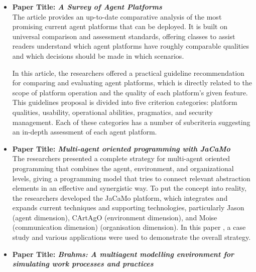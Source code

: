 \begin{itemize}[label={}]
\vspace{.5cm}

\item \textbf{Paper Title: \textit{A Survey of Agent Platforms}}\\

The article \cite{survey} provides an up-to-date comparative analysis of the most promising current agent platforms that can be deployed. It is built on universal comparison and assessment standards, offering classes to assist readers understand which agent platforms have roughly comparable qualities and which decisions should be made in which scenarios.

\vspace{.5cm}

In this article, the researchers offered a practical guideline recommendation for comparing and evaluating agent platforms, which is directly related to the scope of platform operation and the quality of each platform's given feature. This guidelines proposal is divided into five criterion categories: platform qualities, usability, operational abilities, pragmatics, and security management. Each of these categories has a number of subcriteria suggesting an in-depth assessment of each agent platform.

\newpage

\item \textbf{Paper Title: \textit{Multi-agent oriented programming with JaCaMo}}\\

The researchers presented a complete strategy for multi-agent oriented programming that combines the agent, environment, and organizational levels, giving a programming model that tries to connect relevant abstraction elements in an effective and synergistic way. To put the concept into reality, the researchers developed the JaCaMo platform, which integrates and expands current techniques and supporting technologies, particularly Jason (agent dimension), CArtAgO (environment dimension), and Moise (communication dimension) (organisation dimension).  In this paper \cite{Jacamo}, a case study and various applications were used to demonstrate the overall strategy.

\vspace{.5cm}

\item \textbf{Paper Title: \textit{Brahms: A multiagent modelling environment for simulating work processes and practices}}\\


\end{itemize}
